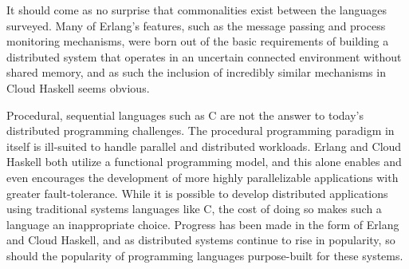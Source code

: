 \documentclass[10pt,a4paper,twocolumn]{article}
\begin{document}
It should come as no surprise that commonalities exist between the languages
surveyed. Many of Erlang's features, such as the message passing and process
monitoring mechanisms, were born out of the basic requirements of building a
distributed system that operates in an uncertain connected environment without
shared memory, and as such the inclusion of incredibly similar mechanisms in
Cloud Haskell seems obvious.

Procedural, sequential languages such as C are not the answer to today's
distributed programming challenges. The procedural programming paradigm in
itself is ill-suited to handle parallel and distributed workloads. Erlang and
Cloud Haskell both utilize a functional programming model, and this alone
enables and even encourages the development of more highly parallelizable
applications with greater fault-tolerance. While it is possible to develop
distributed applications using traditional systems languages like C, the cost of
doing so makes such a language an inappropriate choice. Progress has been made
in the form of Erlang and Cloud Haskell, and as distributed systems continue to
rise in popularity, so should the popularity of programming languages
purpose-built for these systems.

\small



\end{document}
